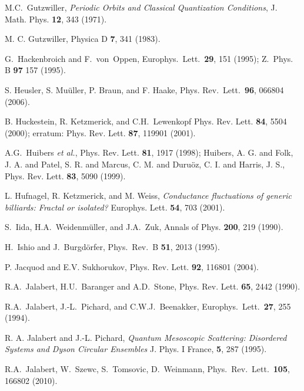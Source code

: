 \documentclass[a4paper,10pt]{article}
\begin{document}
\begin{thebibliography}{Cucc~02b}
M.C.~Gutzwiller, {\it Periodic Orbits and Classical Quantization Conditions}, J. Math. Phys. {\bf 12}, 343 (1971).

M. C. Gutzwiller, Physica D {\bf 7}, 341 (1983).

G.~Hackenbroich and F.~von~Oppen, Europhys.~Lett.~{\bf 29}, 151 (1995);
Z.~Phys. B {\bf 97} 157 (1995).

 S. Heusler, S. Mu\"uller, P. Braun, and F. Haake, Phys. Rev.~Lett.~{\bf 96}, 066804 (2006). 

B. Huckestein, R. Ketzmerick, and C.H.~Lewenkopf
Phys. Rev. Lett. {\bf 84}, 5504 (2000); erratum: Phys. Rev. Lett. 
{\bf 87}, 119901 (2001).

A.G.~Huibers {\em et al.}, Phys. Rev. Lett. {\bf 81}, 1917 (1998);
Huibers, A. G. and Folk, J. A. and Patel, S. R. and Marcus, C. M. and Duru\"oz, C. I. and Harris, J. S., 
Phys. Rev. Lett. {\bf 83}, 5090 (1999).

L. Hufnagel, R. Ketzmerick, and M. Weiss, 
{\it Conductance fluctuations of generic billiards: Fractal or isolated?}
Europhys. Lett. {\bf 54}, 703 (2001). 

S.~Iida, H.A.~Weidenm\"uller, and J.A.~Zuk, Annals of Phys. {\bf 200}, 219 (1990).

H.\ Ishio and J.\ Burgd\"orfer, Phys.\ Rev.\ B {\bf 51}, 2013 (1995).

P. Jacquod and E.V. Sukhorukov, Phys. Rev. Lett. {\bf 92}, 116801 (2004).
  
R.A.~Jalabert, H.U.~Baranger and A.D.~Stone,
Phys. Rev. Lett. {\bf 65}, 2442 (1990).

R.A.~Jalabert, J.-L.~Pichard, and C.W.J.~Beenakker,
Europhys.~Lett.~{\bf 27}, 255 (1994).

R. A. Jalabert and J.-L. Pichard, 
{\it Quantum Mesoscopic Scattering: Disordered Systems and Dyson Circular Ensembles}
J. Phys. I France, {\bf 5}, 287 (1995). 

R.A.\ Jalabert, W.\ Szewc, S.\ Tomsovic, D.\ Weinmann,
Phys.\ Rev.\ Lett.\ \textbf{105}, 166802 (2010).


\end{thebibliography}
\end{document}
